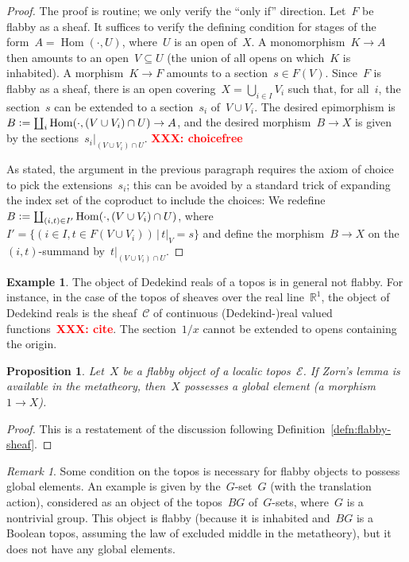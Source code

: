 \documentclass[oneside]{amsart}
\theoremstyle{definition}
\newtheorem{ex}[defn]{Example}
\theoremstyle{plain}
\newtheorem{prop}[defn]{Proposition}
\theoremstyle{remark}
\newtheorem{rem}[defn]{Remark}
\newcommand{\XXX}[1]{\textbf{\textcolor{red}{XXX: #1}}}
\newcommand{\E}{\mathcal{E}}
\newcommand{\defeq}{\vcentcolon=}
\DeclareMathOperator{\Hom}{Hom}
\renewcommand{\_}{\mathpunct{.}\,}
\begin{document}
\begin{proof}The proof is routine; we only verify the ``only if'' direction.
Let~$F$ be flabby as a sheaf. It suffices to verify the defining condition for stages
of the form~$A = \Hom(\cdot,U)$, where~$U$ is an open of~$X$. A monomorphism~$K
\to A$ then amounts to an open~$V \subseteq U$ (the union of all opens on
which~$K$ is inhabited). A morphism~$K \to F$ amounts to a section~$s \in
F(V)$. Since~$F$ is flabby as a sheaf, there is an open covering~$X =
\bigcup_{i \in I} V_i$ such that, for all~$i$, the section~$s$ can be extended
to a section~$s_i$ of~$V \cup V_i$. The desired epimorphism is~$B \defeq
\coprod_i \Hom(\cdot,(V \cup V_i) \cap U) \to A$, and the desired morphism~$B
\to X$ is given by the sections~$s_i|_{(V \cup V_i) \cap U}$.
\XXX{choicefree}

As stated, the argument in the previous paragraph requires the axiom of choice
to pick the extensions~$s_i$; this can be avoided by a standard trick of
expanding the index set of the coproduct to include the choices: We redefine $B \defeq
\coprod_{(i,t) \in I'} \Hom(\cdot, (V \cup V_i) \cap U)$, where~$I' = \{ (i \in
I, t \in F(V \cup V_i)) \,|\, t|_V = s \}$ and define the morphism~$B \to X$ on
the~$(i,t)$-summand by~$t|_{(V \cup V_i) \cap U}$.
\end{proof}

\begin{ex}The object of Dedekind reals of a topos is in general not flabby. For
instance, in the case of the topos of sheaves over the real line~$\mathbb{R}^1$, the
object of Dedekind reals is the sheaf~$\mathcal{C}$ of continuous (Dedekind-)real valued
functions~\XXX{cite}. The section~$1/x$ cannot be extended to opens containing
the origin.\end{ex}

\begin{prop}\label{prop:global-elements}
Let~$X$ be a flabby object of a localic topos~$\E$. If
Zorn's lemma is available in the metatheory, then~$X$ possesses a global element (a morphism~$1 \to X$).
\end{prop}

\begin{proof}This is a restatement of the discussion following
Definition~\ref{defn:flabby-sheaf}.
\end{proof}

\begin{rem}\label{rem:flabby-global}
Some condition on the topos is necessary for flabby objects to
possess global elements. An example is given by the~$G$-set~$G$ (with the
translation action), considered as an object of the topos~$BG$ of~$G$-sets,
where~$G$ is a nontrivial group. This object is flabby (because it is inhabited
and~$BG$ is a Boolean topos, assuming the law of excluded middle in the
metatheory), but it does not have any global elements.
\end{rem}
\end{document}
